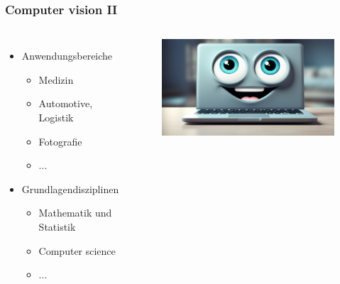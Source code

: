 \documentclass[aspectratio=43, 11pt]{beamer}
\begin{document}
		\begin{frame}
			\frametitle{Computer vision II}
			\begin{columns}
			  	\begin{itemize}
						\item Anwendungsbereiche
							\begin{itemize}
								\vspace{\baselineskip}
								\item Medizin
								\item Automotive, Logistik
								\item Fotografie
								\item ...
							\end{itemize}

						\item Grundlagendisziplinen
							\begin{itemize}
								\item Mathematik und Statistik
								\item Computer science
								\item ...
							\end{itemize}
					\end{itemize}
          \begin{figure}[t]
            \includegraphics[width=1.0\textwidth]{computer_vision_1}
          \end{figure}
          \vspace{\baselineskip}
					\vspace{\baselineskip}
					\vspace{\baselineskip}
					\vspace{\baselineskip}
			\end{columns}
			
		\end{frame}
\end{document}
